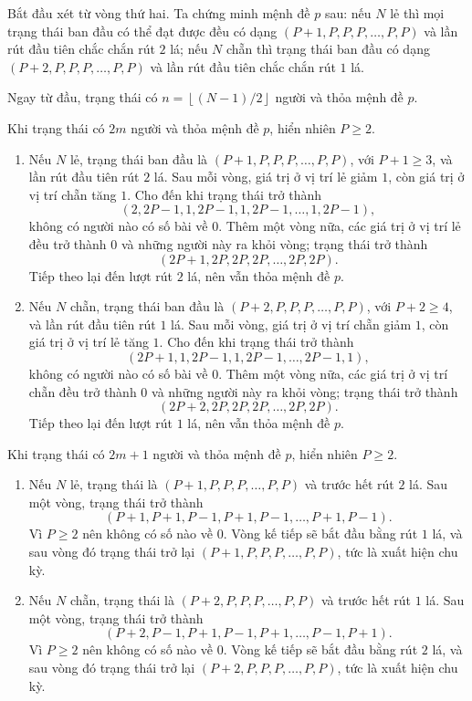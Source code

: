 \documentclass[11pt]{article}
\begin{document}
Bắt đầu xét từ vòng thứ hai. Ta chứng minh mệnh đề $p$ sau: nếu $N$ lẻ thì
mọi trạng thái ban đầu có thể đạt được đều có dạng
$(P+1,P,P,P,\ldots,P,P)$ và lần rút đầu tiên chắc chắn rút $2$ lá; nếu $N$
chẵn thì trạng thái ban đầu có dạng $(P+2,P,P,P,\ldots,P,P)$ và lần rút đầu
tiên chắc chắn rút $1$ lá.

Ngay từ đầu, trạng thái có
$n=\left\lfloor (N-1)/2\right\rfloor$ người và thỏa mệnh đề $p$.

Khi trạng thái có $2m$ người và thỏa mệnh đề $p$, hiển nhiên $P\ge 2$.
\begin{enumerate}
  \item Nếu $N$ lẻ, trạng thái ban đầu là
  $(P+1,P,P,P,\ldots,P,P)$, với $P+1\ge 3$, và lần rút đầu tiên rút $2$ lá.
  Sau mỗi vòng, giá trị ở vị trí lẻ giảm $1$, còn giá trị ở vị trí chẵn tăng
  $1$. Cho đến khi trạng thái trở thành
  \[
    (2,2P-1,1,2P-1,1,2P-1,\ldots,1,2P-1),
  \]
  không có người nào có số bài về $0$. Thêm một vòng nữa, các giá trị ở vị
  trí lẻ đều trở thành $0$ và những người này ra khỏi vòng; trạng thái trở
  thành
  \[
    (2P+1,2P,2P,2P,\ldots,2P,2P).
  \]
  Tiếp theo lại đến lượt rút $2$ lá, nên vẫn thỏa mệnh đề $p$.

  \item Nếu $N$ chẵn, trạng thái ban đầu là
  $(P+2,P,P,P,\ldots,P,P)$, với $P+2\ge 4$, và lần rút đầu tiên rút $1$ lá.
  Sau mỗi vòng, giá trị ở vị trí chẵn giảm $1$, còn giá trị ở vị trí lẻ tăng
  $1$. Cho đến khi trạng thái trở thành
  \[
    (2P+1,1,2P-1,1,2P-1,\ldots,2P-1,1),
  \]
  không có người nào có số bài về $0$. Thêm một vòng nữa, các giá trị ở vị
  trí chẵn đều trở thành $0$ và những người này ra khỏi vòng; trạng thái trở
  thành
  \[
    (2P+2,2P,2P,2P,\ldots,2P,2P).
  \]
  Tiếp theo lại đến lượt rút $1$ lá, nên vẫn thỏa mệnh đề $p$.
\end{enumerate}

Khi trạng thái có $2m+1$ người và thỏa mệnh đề $p$, hiển nhiên $P\ge 2$.
\begin{enumerate}
  \item Nếu $N$ lẻ, trạng thái là $(P+1,P,P,P,\ldots,P,P)$ và trước hết rút
  $2$ lá. Sau một vòng, trạng thái trở thành
  \[
    (P+1,P+1,P-1,P+1,P-1,\ldots,P+1,P-1).
  \]
  Vì $P\ge 2$ nên không có số nào về $0$. Vòng kế tiếp sẽ bắt đầu bằng rút
  $1$ lá, và sau vòng đó trạng thái trở lại
  $(P+1,P,P,P,\ldots,P,P)$, tức là xuất hiện chu kỳ.

  \item Nếu $N$ chẵn, trạng thái là $(P+2,P,P,P,\ldots,P,P)$ và trước hết
  rút $1$ lá. Sau một vòng, trạng thái trở thành
  \[
    (P+2,P-1,P+1,P-1,P+1,\ldots,P-1,P+1).
  \]
  Vì $P\ge 2$ nên không có số nào về $0$. Vòng kế tiếp sẽ bắt đầu bằng rút
  $2$ lá, và sau vòng đó trạng thái trở lại
  $(P+2,P,P,P,\ldots,P,P)$, tức là xuất hiện chu kỳ.
\end{enumerate}
\end{document}
